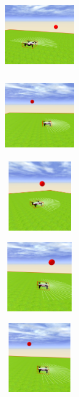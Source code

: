 \begin{figure}[H]
\begin{subfigure}[t]{0.2\textwidth}
    \includegraphics[width=3cm, height=3cm]{img/followBallTello1.png}
\label{fig:figure2_1}
\end{subfigure}\hfill
\begin{subfigure}[t]{0.2\textwidth}
  \includegraphics[width=3cm, height=3cm]{img/followBallTello2.png}
\label{fig:figure2_2}
\end{subfigure}\hfill
\begin{subfigure}[t]{0.2\textwidth}
    \includegraphics[width=3cm, height=3cm]{img/followBallTello3.png}
\label{fig:figure2_3}
\end{subfigure}\hfill
\begin{subfigure}[t]{0.2\textwidth}
    \includegraphics[width=3cm, height=3cm]{img/followBallTello4.png}
\label{fig:figure2_4}
\end{subfigure}
\begin{subfigure}[t]{0.2\textwidth}
    \includegraphics[width=3cm, height=3cm]{img/followBallTello5.png}

\end{subfigure}
\end{figure}
